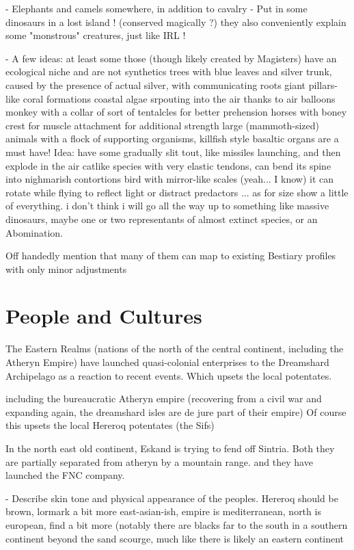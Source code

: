 - Elephants and camels somewhere, in addition to cavalry
- Put in some dinosaurs in a lost island ! (conserved magically ?) they also conveniently explain some "monstrous" creatures, just like IRL !

- A few ideas: at least some those (though likely created by Magisters) have an ecological niche and are not synthetics
	trees with blue leaves and silver trunk, caused by the presence of actual silver, with communicating roots
	giant pillars-like coral formations
	coastal algae srpouting into the air thanks to air balloons
	monkey with a collar of sort of tentalcles for better prehension
	horses with boney crest for muscle attachment for additional strength
	large (mammoth-sized) animals with a flock of supporting organisms, killfish style
	basaltic organs are a must have! Idea: have some gradually slit tout, like missiles launching, and then explode in the air
	catlike species with very elastic tendons, can bend its spine into nighmarish contortions
	bird with mirror-like scales (yeah... I know) it can rotate while flying to reflect light or distract predactors
... as for size show a little of everything. i don't think i will go all the way up to something like massive dinosaurs, maybe one or two representants of almost extinct species, or an Abomination.



Off handedly mention that many of them can map to existing Bestiary profiles with only minor adjustments



\section{People and Cultures}

The Eastern Realms (nations of the north of the central continent, including the Atheryn Empire) have launched quasi-colonial enterprises to the Dreamshard Archipelago as a reaction to recent events. Which upsets the local potentates.


including the bureaucratic Atheryn empire (recovering from a civil war and expanding again, the dreamshard isles are de jure part of their empire)
Of course this upsets the local Hereroq potentates (the Sifs)

In the north east old continent, Eskand is trying to fend off Sintria. Both they are partially separated from atheryn by a mountain range. and they have launched the FNC company. 

- Describe skin tone and physical appearance of the peoples. Hereroq should be brown, lormark a bit more east-asian-ish, empire is mediterranean, north is european, find a bit more (notably there are blacks far to the south in a southern continent beyond the sand scourge, much like there is likely an eastern continent



